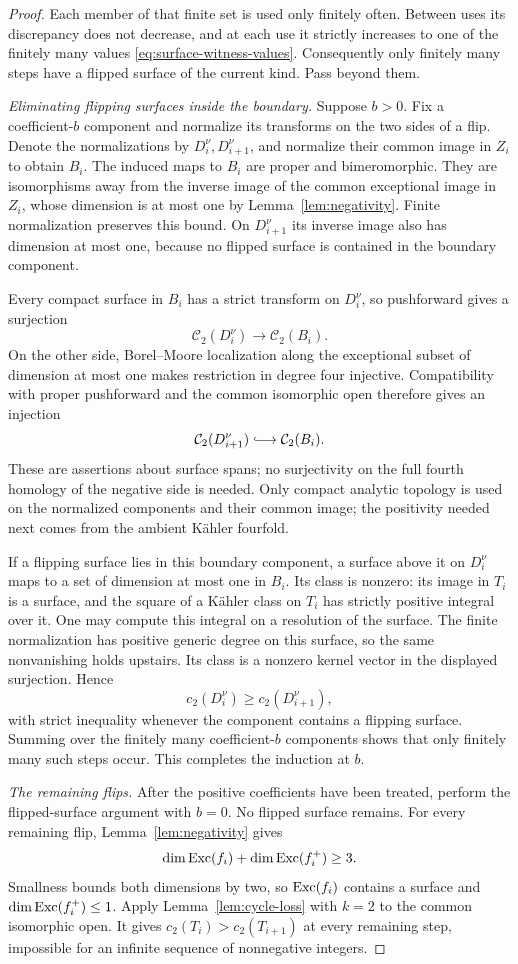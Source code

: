\begin{proof}
Each member of that finite set is used only finitely often.  Between
uses its discrepancy does not decrease, and at each use it strictly
increases to one of the finitely many values
\eqref{eq:surface-witness-values}.  Consequently only finitely many
steps have a flipped surface of the current kind.  Pass beyond them.

\smallskip\noindent
\emph{Eliminating flipping surfaces inside the boundary.}
Suppose $b>0$.  Fix a coefficient-$b$ component and normalize its
transforms on the two sides of a flip.  Denote the normalizations by
$D_i^\nu,D_{i+1}^\nu$, and normalize their common image in $Z_i$ to
obtain $B_i$.  The induced maps to $B_i$ are proper and bimeromorphic.
They are isomorphisms away from the inverse image of the common
exceptional image in $Z_i$, whose dimension is at most one by
Lemma~\ref{lem:negativity}.  Finite normalization preserves this bound.
On $D_{i+1}^\nu$ its inverse image also has dimension at most one,
because no flipped surface is contained in the boundary component.

Every compact surface in $B_i$ has a strict transform on $D_i^\nu$,
so pushforward gives a surjection
\[
 \mathcal C_2(D_i^\nu)\longrightarrow\mathcal C_2(B_i).
\]
On the other side, Borel--Moore localization along the exceptional
subset of dimension at most one makes restriction in degree four
injective.  Compatibility with proper pushforward and the common
isomorphic open therefore gives an injection
\[
 \mathcal C_2(D_{i+1}^\nu)\lhook\joinrel\longrightarrow
 \mathcal C_2(B_i).
\]
These are assertions about surface spans; no surjectivity on the full
fourth homology of the negative side is needed. Only compact analytic
topology is used on the normalized components and their common image;
the positivity needed next comes from the ambient Kähler fourfold.

If a flipping surface lies in this boundary component, a surface above
it on $D_i^\nu$ maps to a set of dimension at most one in $B_i$.
Its class is nonzero: its image in $T_i$ is a surface, and the square
of a K\"ahler class on $T_i$ has strictly positive integral over it.
One may compute this integral on a resolution of the surface.
The finite normalization has positive generic degree on this surface,
so the same nonvanishing holds upstairs.  Its class is a nonzero
kernel vector in the displayed surjection.  Hence
\[
 c_2(D_i^\nu)\geq c_2(D_{i+1}^\nu),
\]
with strict inequality whenever the component contains a flipping
surface.  Summing over the finitely many coefficient-$b$ components
shows that only finitely many such steps occur.  This completes the
induction at $b$.

\smallskip\noindent
\emph{The remaining flips.}
After the positive coefficients have been treated, perform the
flipped-surface argument with $b=0$.  No flipped surface remains.
For every remaining flip, Lemma~\ref{lem:negativity} gives
\[
 \dim\operatorname{Exc}(f_i)+\dim\operatorname{Exc}(f_i^+)\geq3.
\]
Smallness bounds both dimensions by two, so $\operatorname{Exc}(f_i)$ contains a
surface and $\dim\operatorname{Exc}(f_i^+)\leq1$.  Apply
Lemma~\ref{lem:cycle-loss} with $k=2$ to the common isomorphic open.
It gives $c_2(T_i)>c_2(T_{i+1})$ at every remaining step, impossible
for an infinite sequence of nonnegative integers.
\end{proof}

